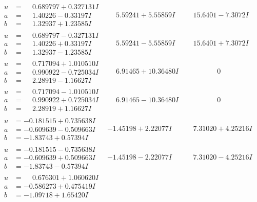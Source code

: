 \documentclass[1p]{elsarticle_modified}
\theoremstyle{definition}
\begin{document}
$$\begin{array}{c|c|c}
\begin{aligned}
u &= \phantom{-}0.689797 + 0.327131 I \\
a &= \phantom{-}1.40226 - 0.33197 I \\
b &= \phantom{-}1.32937 + 1.23585 I\end{aligned}
 & \phantom{-}5.59241 + 5.55859 I & \phantom{-}15.6401 - 7.3072 I \\ \hline\begin{aligned}
u &= \phantom{-}0.689797 - 0.327131 I \\
a &= \phantom{-}1.40226 + 0.33197 I \\
b &= \phantom{-}1.32937 - 1.23585 I\end{aligned}
 & \phantom{-}5.59241 - 5.55859 I & \phantom{-}15.6401 + 7.3072 I \\ \hline\begin{aligned}
u &= \phantom{-}0.717094 + 1.010510 I \\
a &= \phantom{-}0.990922 - 0.725034 I \\
b &= \phantom{-}2.28919 - 1.16627 I\end{aligned}
 & \phantom{-}6.91465 + 10.36480 I & \phantom{-0.000000 } 0 \\ \hline\begin{aligned}
u &= \phantom{-}0.717094 - 1.010510 I \\
a &= \phantom{-}0.990922 + 0.725034 I \\
b &= \phantom{-}2.28919 + 1.16627 I\end{aligned}
 & \phantom{-}6.91465 - 10.36480 I & \phantom{-0.000000 } 0 \\ \hline\begin{aligned}
u &= -0.181515 + 0.735638 I \\
a &= -0.609639 - 0.509663 I \\
b &= -1.83743 + 0.57394 I\end{aligned}
 & -1.45198 + 2.22077 I & \phantom{-}7.31020 + 4.25216 I \\ \hline\begin{aligned}
u &= -0.181515 - 0.735638 I \\
a &= -0.609639 + 0.509663 I \\
b &= -1.83743 - 0.57394 I\end{aligned}
 & -1.45198 - 2.22077 I & \phantom{-}7.31020 - 4.25216 I \\ \hline\begin{aligned}
u &= \phantom{-}0.676301 + 1.060620 I \\
a &= -0.586273 + 0.475419 I \\
b &= -1.09718 + 1.65420 I\end{aligned}

\end{array}$$
\end{document}
